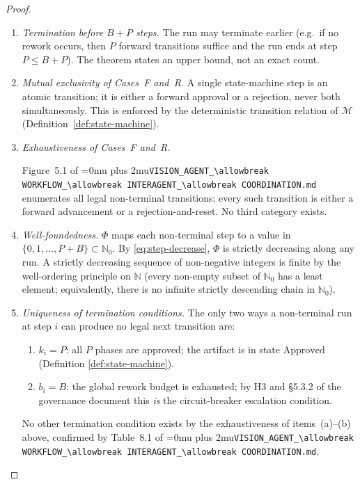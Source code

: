 \documentclass[12pt]{article}
\theoremstyle{definition}
\DeclareRobustCommand{\code}[1]{\begingroup\Urlmuskip=0mu plus 2mu\relax\nolinkurl{#1}\endgroup}
\newcommand{\VisionFlow}{\code{VISION\_AGENT\_\allowbreak WORKFLOW\_\allowbreak INTERAGENT\_\allowbreak COORDINATION.md}}
\begin{document}
\begin{proof}
\begin{enumerate}
  \item \emph{Termination before $B + P$ steps.}
        The run may terminate earlier (e.g.\ if no rework occurs,
        then $P$ forward transitions suffice and the run ends at
        step~$P \leq B+P$).  The theorem states an upper bound, not
        an exact count.

  \item \emph{Mutual exclusivity of Cases~F and~R.}
        A single state-machine step is an atomic transition; it is
        either a forward approval or a rejection, never both
        simultaneously.  This is enforced by the deterministic
        transition relation of $\mathcal{M}$
        (Definition~\ref{def:state-machine}).

  \item \emph{Exhaustiveness of Cases~F and~R.}
        \begin{sloppypar}
        Figure~5.1 of
        \VisionFlow{}
        enumerates all legal non-terminal transitions; every such
        transition is either a forward advancement or a
        rejection-and-reset.  No third category exists.
        \end{sloppypar}

  \item \emph{Well-foundedness.}
        $\Phi$ maps each non-terminal step to a value in
        $\{0, 1, \ldots, P+B\} \subset \mathbb{N}_0$.  By
        \eqref{eq:step-decrease}, $\Phi$ is strictly decreasing along
        any run.  A strictly decreasing sequence of non-negative
        integers is finite by the well-ordering principle on
        $\mathbb{N}$ (every non-empty subset of $\mathbb{N}_0$ has a
        least element; equivalently, there is no infinite strictly
        descending chain in $\mathbb{N}_0$).

  \item \emph{Uniqueness of termination conditions.}
        The only two ways a non-terminal run at step $i$ can produce
        no legal next transition are:
        \begin{enumerate}
          \item $k_i = P$: all $P$ phases are approved; the artifact
                is in state $\mathrm{Approved}$ (Definition
                \ref{def:state-machine}).
          \item $b_i = B$: the global rework budget is exhausted;
                by H3 and \S5.3.2 of the governance document this
                \emph{is} the circuit-breaker escalation condition.
        \end{enumerate}
        No other termination condition exists by the exhaustiveness
        of items~(a)--(b) above, confirmed by Table~8.1 of
        \VisionFlow{}.
\end{enumerate}


\end{proof}
\end{document}
